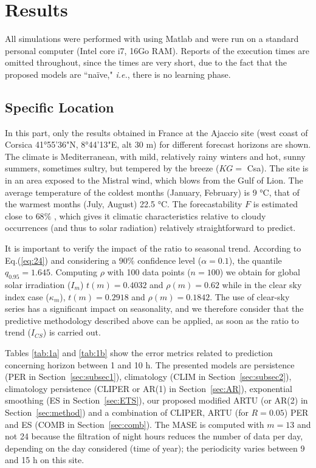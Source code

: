 \section{Results}
\label{sec:result}

All simulations were performed with using Matlab and were run on a standard personal computer (Intel core i7, 16Go RAM). Reports of the execution times are omitted throughout, since the times are very short, due to the fact that the proposed models are ``na\"ive," \textit{i.e.}, there is no learning phase. 

\subsection{Specific Location}
\label{sec:ajaccio}
In this part, only the results obtained in France at the Ajaccio site (west coast of Corsica 41°55'36"N, 8°44'13"E, alt 30 m) for different forecast horizons are shown. The climate is Mediterranean, with mild, relatively rainy winters and hot, sunny summers, sometimes sultry, but tempered by the breeze ($KG=$ Csa). The site is in an area exposed to the Mistral wind, which blows from the Gulf of Lion. The average temperature of the coldest months (January, February) is 9 °C, that of the warmest months (July, August) 22.5 °C. The forecastability $F$ is estimated close to $68\%$ \citep{doi:10.1063/5.0042710}, which gives it climatic characteristics relative to cloudy occurrences (and thus to solar radiation) relatively straightforward to predict. 

It is important to verify the impact of the ratio to seasonal trend. According to Eq.(\ref{eq:24}) and considering a $90\%$ confidence level ($\alpha=0.1$), the quantile $q_{0.95}=1.645$. Computing $\rho$ with 100 data points ($n=100$) we obtain for global solar irradiation ($I_m$) $t(m)=0.4032$ and $\rho(m)=0.62$ while in the clear sky index case ($\kappa_m$), $t(m)=0.2918$  and $\rho(m)=0.1842$. The use of clear-sky series has a significant impact on seasonality, and we therefore consider that the predictive methodology described above can be applied, as soon as the ratio to trend ($I_{CS}$) is carried out.

Tables \ref{tab:1a} and \ref{tab:1b} show the error metrics related to prediction concerning horizon between 1 and 10 h. The presented models are persistence (PER in Section~\ref{sec:subsec1}), climatology (CLIM in Section~\ref{sec:subsec2}), climatology persistence (CLIPER or AR(1) in Section~\ref{sec:AR}), exponential smoothing (ES in Section~\ref{sec:ETS}), our proposed modified ARTU (or AR(2) in Section~\ref{sec:method}) and a combination of  CLIPER, ARTU (for $R=0.05$) PER and ES (COMB in Section~\ref{sec:comb}). The MASE is computed with $m=13$ and not 24 because the filtration of night hours reduces the number of data per day, depending on the day considered (time of year); the periodicity varies between 9 and 15 h on this site. 


